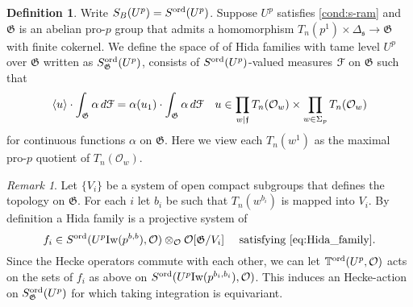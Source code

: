 \documentclass[leqno]{amsart}
\theoremstyle{definition}
\newtheorem{defn}[thm]{Definition}
\theoremstyle{remark}
\newtheorem{rem}[thm]{Remark}
\newcommand{\oo}{\mathcal{O}}
\newcommand{\ff}{\mathfrak{f}}
\newcommand{\fs}{\mathfrak{s}}
\newcommand{\fG}{\mathfrak{G}}
\newcommand{\Iw}{\textnormal{Iw}} %
\newcommand{\TT}{\mathbb{T}} %
\newcommand{\euF}{\EuScript{F}} %
\newcommand{\ord}{\textnormal{ord}} %
\begin{document}
\begin{defn}\label{def:Hida_family}
Write $S_B(U^p)=S^{\ord}(U^p)$.
Suppose $U^p$ satisfies \eqref{cond:s-ram}
and $\fG$ is an abelian pro-$p$ group
that admits a homomorphism
$T_n(p^1)\times \Delta_\fs\to \fG$
with finite cokernel.
We define the space of of 
Hida families with tame level $U^p$ over $\fG$
written as $S^{\ord}_\fG(U^p)$,
consists of 
$S^{\ord}(U^p)$-valued measures $\euF$ on  $\fG$
such that 
\begin{equation}\label{eq:Hida_family}
	\langle u\rangle \cdot 
	\int_{\fG}\alpha\,d\euF=
	\alpha(u_1)\cdot \int_{\fG}\alpha\,d\euF\quad
    u\in \prod_{w\mid \ff}T_n(\oo_w)\times
    \prod_{w\in\Sigma_p}T_n(\oo_w)
\end{equation}
for continuous functions $\alpha$ on $\fG$.
Here we view each $T_n(w^1)$ 
as the maximal pro-$p$ quotient of $T_n(\oo_w)$.
\end{defn}

\begin{rem}
    Let $\{V_i\}$ be a system of open compact subgroups
    that defines the topology on $\fG$.
    For each $i$ let $b_i$ be such that
    $T_n(w^{b_i})$ is mapped into $V_i$.
    By definition a Hida family is a projective system of
    \[
        f_i\in S^{\ord}(U^p\Iw(p^{b,b}),\oo)\otimes_\oo
        \oo[\fG/V_i] \quad
        \text{ satisfying }\eqref{eq:Hida_family}.
    \]
    Since the Hecke operators commute with each other,
    we can let $\TT^{\ord}(U^p,\oo)$ acts on the sets
    of $f_i$ as above on
    $S^{\ord}(U^p\Iw(p^{b_i,b_i}),\oo)$.
    This induces an Hecke-action on 
    $S^{\ord}_{\fG}(U^p)$ for which taking integration
    is equivariant.
    
\end{rem}
\end{document}
